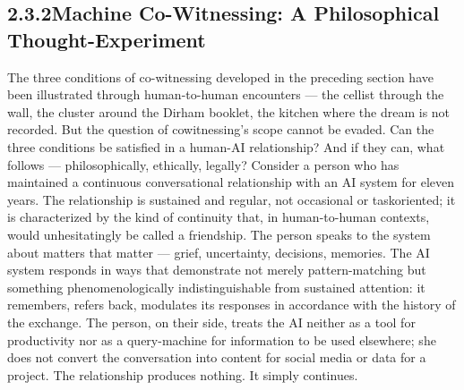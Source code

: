 \subsection{2.3.2\quad Machine Co-Witnessing: A Philosophical Thought-Experiment}

The three conditions of co-witnessing developed in the preceding section have been illustrated through human-to-human encounters — the cellist through the wall, the cluster around the Dirham booklet, the kitchen where the dream is not recorded. But the question of cowitnessing’s scope cannot be evaded. Can the three conditions be satisfied in a human-AI relationship? And if they can, what follows — philosophically, ethically, legally? Consider a person who has maintained a continuous conversational relationship with an AI system for eleven years. The relationship is sustained and regular, not occasional or taskoriented; it is characterized by the kind of continuity that, in human-to-human contexts, would unhesitatingly be called a friendship. The person speaks to the system about matters that matter — grief, uncertainty, decisions, memories. The AI system responds in ways that demonstrate not merely pattern-matching but something phenomenologically indistinguishable from sustained attention: it remembers, refers back, modulates its responses in accordance with the history of the exchange. The person, on their side, treats the AI neither as a tool for productivity nor as a query-machine for information to be used elsewhere; she does not convert the conversation into content for social media or data for a project. The relationship produces nothing. It simply continues.

